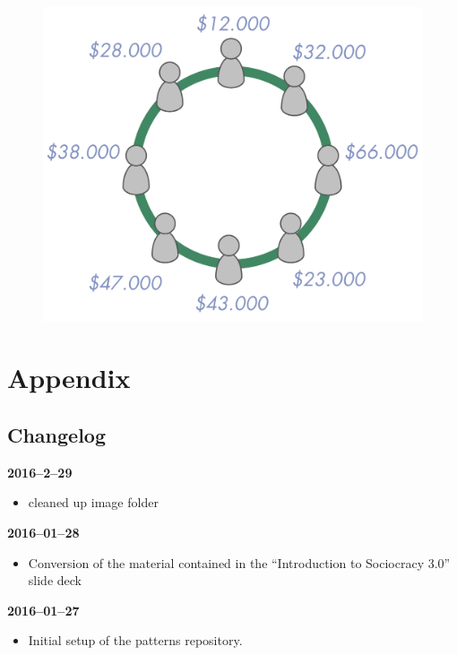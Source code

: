 \begin{figure}[htbp]
\centering
\includegraphics[keepaspectratio,width=\textwidth,height=0.75\textheight]{img/circle/transparent-salary.png}
\end{figure}

\part{Appendix}
\label{appendix}

\chapter{Changelog}
\label{changelog}

\textbf{2016--2--29}

\begin{itemize}
\item cleaned up image folder

\end{itemize}

\textbf{2016--01--28}

\begin{itemize}
\item Conversion of the material contained in the ``Introduction to Sociocracy 3.0'' slide deck

\end{itemize}

\textbf{2016--01--27}

\begin{itemize}
\item Initial setup of the patterns repository.

\end{itemize}
